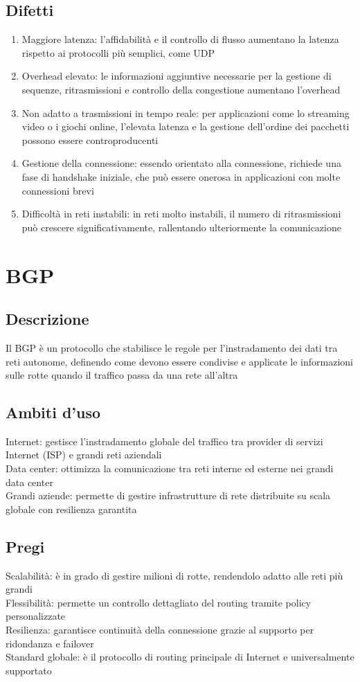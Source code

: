 \documentclass[10pt,oneside,a4paper]{article}
\begin{document}
\subsection{Difetti}
\begin{enumerate}
\item Maggiore latenza: l'affidabilità e il controllo di flusso aumentano la latenza rispetto ai protocolli più semplici, come UDP
\item Overhead elevato: le informazioni aggiuntive necessarie per la gestione di sequenze, ritrasmissioni e controllo della congestione aumentano l'overhead
\item Non adatto a trasmissioni in tempo reale: per applicazioni come lo streaming video o i giochi online, l'elevata latenza e la gestione dell'ordine dei pacchetti possono essere controproducenti
\item Gestione della connessione: essendo orientato alla connessione, richiede una fase di handshake iniziale, che può essere onerosa in applicazioni con molte connessioni brevi
\item Difficoltà in reti instabili: in reti molto instabili, il numero di ritrasmissioni può crescere significativamente, rallentando ulteriormente la comunicazione
\end{enumerate}
\section{BGP}
\subsection{Descrizione}
Il BGP è un protocollo che stabilisce le regole per l'instradamento dei dati tra reti autonome, definendo come devono essere condivise e applicate le informazioni sulle rotte quando il traffico passa da una rete all'altra
\subsection{Ambiti d'uso}
Internet: gestisce l'instradamento globale del traffico tra provider di servizi Internet (ISP) e grandi reti aziendali\\
Data center: ottimizza la comunicazione tra reti interne ed esterne nei grandi data center\\
Grandi aziende: permette di gestire infrastrutture di rete distribuite su scala globale con resilienza garantita
\subsection{Pregi}
Scalabilità: è in grado di gestire milioni di rotte, rendendolo adatto alle reti più grandi\\
Flessibilità: permette un controllo dettagliato del routing tramite policy personalizzate\\
Resilienza: garantisce continuità della connessione grazie al supporto per ridondanza e failover\\
Standard globale: è il protocollo di routing principale di Internet e universalmente supportato
\end{document}

